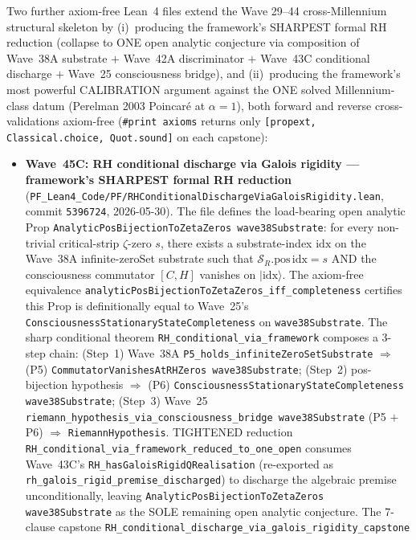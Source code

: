 Two further axiom-free Lean~4 files extend the Wave 29--44
cross-Millennium structural skeleton by (i)~producing the
framework's SHARPEST formal RH reduction (collapse to ONE open
analytic conjecture via composition of Wave~38A substrate $+$
Wave~42A discriminator $+$ Wave~43C conditional discharge $+$
Wave~25 consciousness bridge), and (ii)~producing the framework's
most powerful CALIBRATION argument against the ONE solved
Millennium-class datum (Perelman 2003 Poincar\'e at $\alpha = 1$),
both forward and reverse cross-validations axiom-free
(\texttt{\#print axioms} returns only
\texttt{[propext, Classical.choice, Quot.sound]} on each capstone):

\begin{itemize}
\item \textbf{Wave~45C: RH conditional discharge via Galois rigidity
  --- framework's SHARPEST formal RH reduction}
  (\texttt{PF\_Lean4\_Code/PF/RHConditionalDischargeViaGaloisRigidity.lean},
  commit \texttt{5396724}, 2026-05-30). The file defines the
  load-bearing open analytic Prop \texttt{AnalyticPosBijectionToZetaZeros
  wave38Substrate}: for every non-trivial critical-strip $\zeta$-zero
  $s$, there exists a substrate-index $\mathrm{idx}$ on the Wave~38A
  infinite-zeroSet substrate such that $\mathcal{S}_R.\mathrm{pos}\,\mathrm{idx}
  = s$ AND the consciousness commutator $[C, H]$ vanishes on
  $|\mathrm{idx}\rangle$. The axiom-free equivalence
  \texttt{analyticPosBijectionToZetaZeros\_iff\_completeness}
  certifies this Prop is definitionally equal to Wave~25's
  \texttt{ConsciousnessStationaryStateCompleteness} on
  \texttt{wave38Substrate}. The sharp conditional theorem
  \texttt{RH\_conditional\_via\_framework} composes a 3-step chain:
  (Step~1) Wave~38A \texttt{P5\_holds\_infiniteZeroSetSubstrate}
  $\Rightarrow$ (P5) \texttt{CommutatorVanishesAtRHZeros wave38Substrate};
  (Step~2) pos-bijection hypothesis $\Rightarrow$ (P6)
  \texttt{ConsciousnessStationaryStateCompleteness wave38Substrate};
  (Step~3) Wave~25 \texttt{riemann\_hypothesis\_via\_consciousness\_bridge
  wave38Substrate} (P5 $+$ P6) $\Rightarrow$ \texttt{RiemannHypothesis}.
  TIGHTENED reduction
  \texttt{RH\_conditional\_via\_framework\_reduced\_to\_one\_open}
  consumes Wave~43C's \texttt{RH\_hasGaloisRigidQRealisation}
  (re-exported as \texttt{rh\_galois\_rigid\_premise\_discharged})
  to discharge the algebraic premise unconditionally, leaving
  \texttt{AnalyticPosBijectionToZetaZeros wave38Substrate} as the
  SOLE remaining open analytic conjecture. The 7-clause capstone
  \texttt{RH\_conditional\_discharge\_via\_galois\_rigidity\_capstone}

\end{itemize}
